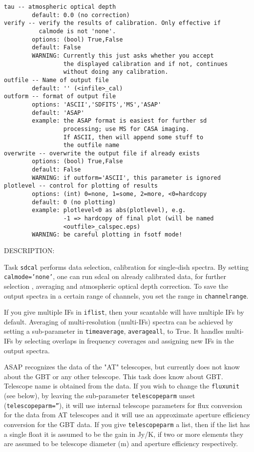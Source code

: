 \begin{verbatim}
tau -- atmospheric optical depth
        default: 0.0 (no correction)
verify -- verify the results of calibration. Only effective if 
          calmode is not 'none'.
        options: (bool) True,False
        default: False
        WARNING: Currently this just asks whether you accept
                 the displayed calibration and if not, continues
                 without doing any calibration. 
outfile -- Name of output file
        default: '' (<infile>_cal)
outform -- format of output file
        options: 'ASCII','SDFITS','MS','ASAP'
        default: 'ASAP'
        example: the ASAP format is easiest for further sd
                 processing; use MS for CASA imaging.
                 If ASCII, then will append some stuff to
                 the outfile name
overwrite -- overwrite the output file if already exists
        options: (bool) True,False
        default: False
        WARNING: if outform='ASCII', this parameter is ignored
plotlevel -- control for plotting of results
        options: (int) 0=none, 1=some, 2=more, <0=hardcopy
        default: 0 (no plotting)
        example: plotlevel<0 as abs(plotlevel), e.g.
                 -1 => hardcopy of final plot (will be named
                 <outfile>_calspec.eps)
        WARNING: be careful plotting in fsotf mode!
\end{verbatim}

DESCRIPTION:

Task {\tt sdcal} performs data selection, calibration for single-dish
spectra.  By setting {\tt calmode='none'}, one can run sdcal on already 
calibrated data, for further selection , averaging and atmospheric 
optical depth correction. To save the output spectra in a certain
range of channels, you set the range in {\tt channelrange}.

If you give multiple IFs in {\tt iflist}, then your scantable will have
multiple IFs by default. Averaging of multi-resolution (multi-IFs)
spectra can be achieved by setting a sub-parameter in {\tt timeaverage}, 
{\tt averageall}, to True. It handles multi-IFs by selecting overlaps in 
frequency coverages and assigning new IFs in the output spectra.

ASAP recognizes the data of the "AT" telescopes, but currently
does not know about the GBT or any other telescope. This task
does know about GBT. Telescope name is obtained from the data.
If you wish to change the {\tt fluxunit} (see below), by leaving
the sub-parameter {\tt telescopeparm} unset ({\tt telescopeparm=''}),
it will use internal telescope parameters for
flux conversion for the data from AT telescopes and it will use an
approximate aperture efficiency conversion for the GBT data.
If you give {\tt telescopeparm} a list, then if the list has a single 
float it is assumed to be the gain in Jy/K, if two or more elements 
they are assumed to be telescope diameter (m) and aperture efficiency
respectively.

